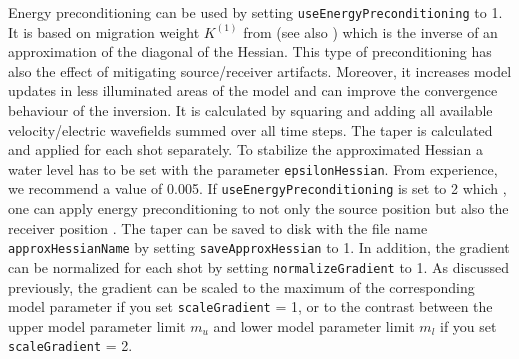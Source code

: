 \documentclass[pdftex,a4paper,parskip,listof=totoc,bibliography=totoc,onehalfspacing,12pt]{scrreprt}
\begin{document}
Energy preconditioning can be used by setting \verb+useEnergyPreconditioning+ to 1. It is based on migration weight $K^{(1)}$ from \cite{plessix2004frequency} (see also \cite{shin2001improved}) which is the inverse of an approximation of the diagonal of the Hessian. This type of preconditioning has also the effect of mitigating source/receiver artifacts. Moreover, it increases model updates in less illuminated areas of the model and can improve the convergence behaviour of the inversion. It is calculated by squaring and adding all available velocity/electric wavefields summed over all time steps. The taper is calculated and applied for each shot separately. To stabilize the approximated Hessian a water level has to be set with the parameter \verb+epsilonHessian+. From experience, we recommend a value of 0.005. If \verb+useEnergyPreconditioning+ is set to 2 which , one can apply energy preconditioning to not only the source position but also the receiver position \citep{kurzmann2013acoustic}.
The taper can be saved to disk with the file name \verb+approxHessianName+ by setting \verb+saveApproxHessian+ to 1.
In addition, the gradient can be normalized for each shot by setting \verb+normalizeGradient+ to 1.
As discussed previously, the gradient can be scaled to the maximum of the corresponding model parameter if you set \verb+scaleGradient+ = 1, or to the contrast between the upper model parameter limit $m_u$ and lower model parameter limit $m_l$ if you set \verb+scaleGradient+ = 2.
\end{document}
